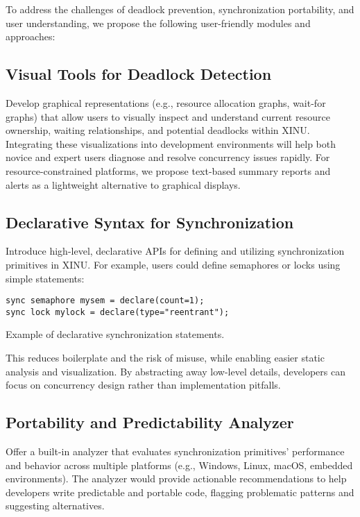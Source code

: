 \documentclass[conference,a4paper]{IEEEtran}
\begin{document}
To address the challenges of deadlock prevention, synchronization portability, and user understanding, we propose the following user-friendly modules and approaches:

\subsection{Visual Tools for Deadlock Detection}

Develop graphical representations (e.g., resource allocation graphs, wait-for graphs) that allow users to visually inspect and understand current resource ownership, waiting relationships, and potential deadlocks within XINU. Integrating these visualizations into development environments will help both novice and expert users diagnose and resolve concurrency issues rapidly. For resource-constrained platforms, we propose text-based summary reports and alerts as a lightweight alternative to graphical displays.

\subsection{Declarative Syntax for Synchronization}

Introduce high-level, declarative APIs for defining and utilizing synchronization primitives in XINU. For example, users could define semaphores or locks using simple statements:

\begin{listing}[ht]
\begin{verbatim}
sync semaphore mysem = declare(count=1);
sync lock mylock = declare(type="reentrant");
\end{verbatim}
\caption{Example of declarative synchronization statements.}
\end{listing}

This reduces boilerplate and the risk of misuse, while enabling easier static analysis and visualization. By abstracting away low-level details, developers can focus on concurrency design rather than implementation pitfalls.

\subsection{Portability and Predictability Analyzer}

Offer a built-in analyzer that evaluates synchronization primitives’ performance and behavior across multiple platforms (e.g., Windows, Linux, macOS, embedded environments). The analyzer would provide actionable recommendations to help developers write predictable and portable code, flagging problematic patterns and suggesting alternatives.
\end{document}
